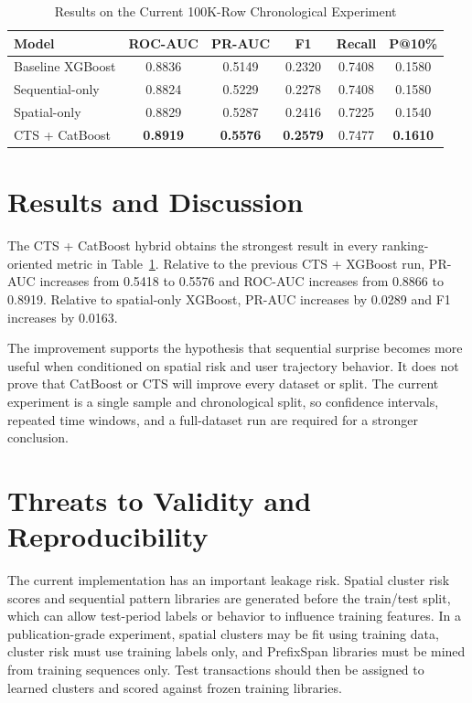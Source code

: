 \documentclass[conference]{IEEEtran}
\begin{document}
\begin{table}[t]
\caption{Results on the Current 100K-Row Chronological Experiment}
\label{tab:results}
\centering
\scriptsize
\begin{tabular}{lccccc}
\toprule
Model & ROC-AUC & PR-AUC & F1 & Recall & P@10\% \\
\midrule
Baseline XGBoost & 0.8836 & 0.5149 & 0.2320 & 0.7408 & 0.1580 \\
Sequential-only & 0.8824 & 0.5229 & 0.2278 & 0.7408 & 0.1580 \\
Spatial-only & 0.8829 & 0.5287 & 0.2416 & 0.7225 & 0.1540 \\
CTS + CatBoost & \textbf{0.8919} & \textbf{0.5576} & \textbf{0.2579} & 0.7477 & \textbf{0.1610} \\
\bottomrule
\end{tabular}
\end{table}

\section{Results and Discussion}
The CTS + CatBoost hybrid obtains the strongest result in every ranking-oriented metric in Table~\ref{tab:results}. Relative to the previous CTS + XGBoost run, PR-AUC increases from 0.5418 to 0.5576 and ROC-AUC increases from 0.8866 to 0.8919. Relative to spatial-only XGBoost, PR-AUC increases by 0.0289 and F1 increases by 0.0163.

The improvement supports the hypothesis that sequential surprise becomes more useful when conditioned on spatial risk and user trajectory behavior. It does not prove that CatBoost or CTS will improve every dataset or split. The current experiment is a single sample and chronological split, so confidence intervals, repeated time windows, and a full-dataset run are required for a stronger conclusion.

\section{Threats to Validity and Reproducibility}
The current implementation has an important leakage risk. Spatial cluster risk scores and sequential pattern libraries are generated before the train/test split, which can allow test-period labels or behavior to influence training features. In a publication-grade experiment, spatial clusters may be fit using training data, cluster risk must use training labels only, and PrefixSpan libraries must be mined from training sequences only. Test transactions should then be assigned to learned clusters and scored against frozen training libraries.
\end{document}
